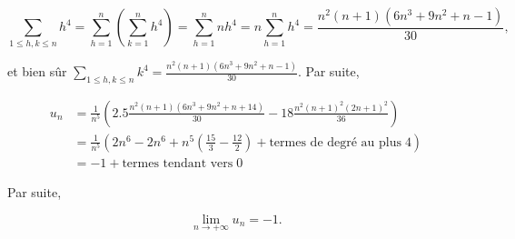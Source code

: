 {\begin{enumerate}
{$$\sum_{1\leq h,k\leq
n}^{}h^4=\sum_{h=1}^{n}(\sum_{k=1}^{n}h^4)=\sum_{h=1}^{n}nh^4=n\sum_{h=1}^{n}h^4=\frac{n^2(n+1)(6n^3+9n^2+n-1)}{30},$$

et bien sûr $\sum_{1\leq h,k\leq
n}^{}k^4=\frac{n^2(n+1)(6n^3+9n^2+n-1)}{30}$. Par suite,

\begin{align*}
u_n&=\frac{1}{n^5}\left(2.5\frac{n^2(n+1)(6n^3+9n^2+n+14)}{30}-18\frac{n^2(n+1)^2(2n+1)^2}{36}\right)\\
 &=\frac{1}{n^5}(2n^6-2n^6+n^5(\frac{15}{3}-\frac{12}{2})+\mbox{termes de degré au plus}\;4)\\
 &=-1+\mbox{termes tendant vers}\;0
\end{align*}

Par suite,

$$\lim_{n\rightarrow +\infty}u_n=-1.$$}
\end{enumerate}
}
